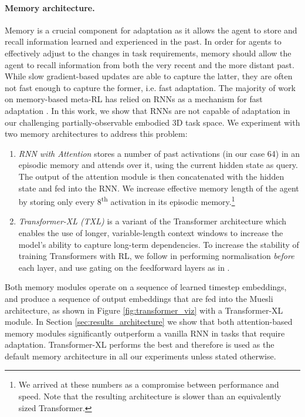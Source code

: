 \paragraph{Memory architecture.} 
\label{sec:memory-architectures}
Memory is a crucial component for adaptation as it allows the agent to store and recall information learned and experienced in the past. In order for agents to effectively adjust to the changes in task requirements, memory should allow the agent to recall information from both the very recent and the more distant past. While slow gradient-based updates are able to capture the latter, they are often not fast enough to capture the former, i.e. fast adaptation. The majority of work on memory-based meta-RL has relied on RNNs as a mechanism for fast adaptation \citep{parisotto2021meta}. In this work, we show that RNNs are not capable of adaptation in our challenging partially-observable embodied 3D task space. We experiment with two memory architectures to address this problem:

\begin{enumerate}\setlength{\itemsep}{6pt}
\item \emph{RNN with Attention} stores a number of past activations (in our case 64) in an episodic memory and attends over it, using the current hidden state as query. The output of the attention module is then concatenated with the hidden state and fed into the RNN. We increase effective memory length of the agent by storing only every 8\textsuperscript{th} activation in its episodic memory.\footnote{We arrived at these numbers as a compromise between performance and speed. Note that the resulting architecture is slower than an equivalently sized Transformer.}
\item \emph{Transformer-XL (TXL)} \citep{dai2019transformer} is a variant of the Transformer architecture \citep{vaswani2017attention} which enables the use of longer, variable-length context windows to increase the model's ability to capture long-term dependencies. To increase the stability of training Transformers with RL, we follow \citet{parisotto2020stabilizing} in performing  normalisation \textit{before} each layer, and use gating on the feedforward layers as in \citet{shazeer2020glu}.
\end{enumerate}

Both memory modules operate on a sequence of learned timestep embeddings, and produce a sequence of output embeddings that are fed into the Muesli architecture, as shown in Figure \ref{fig:transformer_viz} with a Transformer-XL module. In Section \ref{sec:results_architecture} we show that both attention-based memory modules significantly outperform a vanilla RNN in tasks that require adaptation. Transformer-XL performs the best and therefore is used as the default memory architecture in all our experiments unless stated otherwise. 

